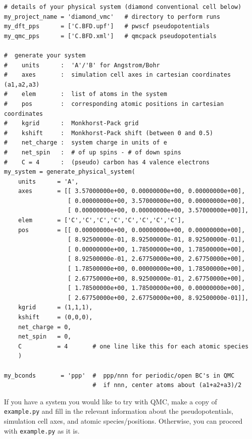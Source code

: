 \begin{shaded}
\begin{verbatim}
# details of your physical system (diamond conventional cell below)
my_project_name = 'diamond_vmc'   # directory to perform runs
my_dft_pps      = ['C.BFD.upf']   # pwscf pseudopotentials
my_qmc_pps      = ['C.BFD.xml']   # qmcpack pseudopotentials

#  generate your system
#    units      :  'A'/'B' for Angstrom/Bohr
#    axes       :  simulation cell axes in cartesian coordinates (a1,a2,a3)
#    elem       :  list of atoms in the system
#    pos        :  corresponding atomic positions in cartesian coordinates
#    kgrid      :  Monkhorst-Pack grid
#    kshift     :  Monkhorst-Pack shift (between 0 and 0.5)
#    net_charge :  system charge in units of e
#    net_spin   :  # of up spins - # of down spins
#    C = 4      :  (pseudo) carbon has 4 valence electrons
my_system = generate_physical_system(
    units      = 'A',
    axes       = [[ 3.57000000e+00, 0.00000000e+00, 0.00000000e+00],
                  [ 0.00000000e+00, 3.57000000e+00, 0.00000000e+00],
                  [ 0.00000000e+00, 0.00000000e+00, 3.57000000e+00]],
    elem       = ['C','C','C','C','C','C','C','C'],
    pos        = [[ 0.00000000e+00, 0.00000000e+00, 0.00000000e+00],
                  [ 8.92500000e-01, 8.92500000e-01, 8.92500000e-01],
                  [ 0.00000000e+00, 1.78500000e+00, 1.78500000e+00],
                  [ 8.92500000e-01, 2.67750000e+00, 2.67750000e+00],
                  [ 1.78500000e+00, 0.00000000e+00, 1.78500000e+00],
                  [ 2.67750000e+00, 8.92500000e-01, 2.67750000e+00],
                  [ 1.78500000e+00, 1.78500000e+00, 0.00000000e+00],
                  [ 2.67750000e+00, 2.67750000e+00, 8.92500000e-01]],
    kgrid      = (1,1,1),
    kshift     = (0,0,0),
    net_charge = 0,
    net_spin   = 0,
    C          = 4       # one line like this for each atomic species
    )

my_bconds       = 'ppp'  #  ppp/nnn for periodic/open BC's in QMC
                         #  if nnn, center atoms about (a1+a2+a3)/2
\end{verbatim}
\end{shaded}

If you have a system you would like to try with QMC, make a copy of \texttt{example.py} and fill in the relevant information about the pseudopotentials, simulation cell axes, and atomic species/positions.  Otherwise, you can proceed with \texttt{example.py} as it is.

